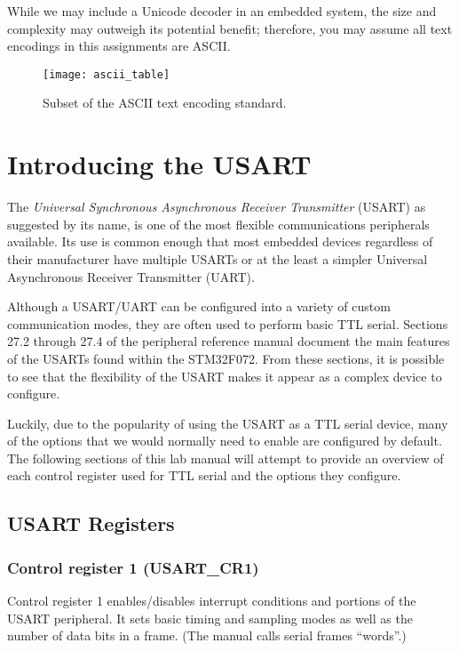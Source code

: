 \documentclass[openany,11pt,fleqn]{book} %
\begin{document}
While we may include a Unicode decoder in an embedded system, the size and complexity may outweigh its potential benefit; therefore, you may assume all text encodings in this assignments are ASCII.

\begin{figure}[]
    \centering\texttt{[image: ascii\_table]}
    \caption{Subset of the ASCII text encoding standard.}
    \label{ascii_table}
\end{figure}


\section{Introducing the USART}
The \textit{Universal Synchronous Asynchronous Receiver Transmitter} (USART) as suggested by its name, is one of the most flexible communications peripherals available. Its use is common enough that most embedded devices regardless of their manufacturer have multiple USARTs or at the least a simpler Universal Asynchronous Receiver Transmitter (UART).

Although a USART/UART can be configured into a variety of custom communication modes, they are often used to perform basic TTL serial. Sections 27.2 through 27.4 of the peripheral reference manual document the main features of the USARTs found within the STM32F072. From these sections, it is possible to see that the flexibility of the USART makes it appear as a complex device to configure. 

Luckily, due to the popularity of using the USART as a TTL serial device, many of the options that we would normally need to enable are configured by default. The following sections of this lab manual will attempt to provide an overview of each control register used for TTL serial and the options they configure. 

\subsection{USART Registers}	

\subsubsection{Control register 1 (USART\_CR1)}
Control register 1 enables/disables interrupt conditions and portions of the USART peripheral. It sets basic timing and sampling modes as well as the number of data bits in a frame. (The manual calls serial frames ``words''.) 
\end{document}
